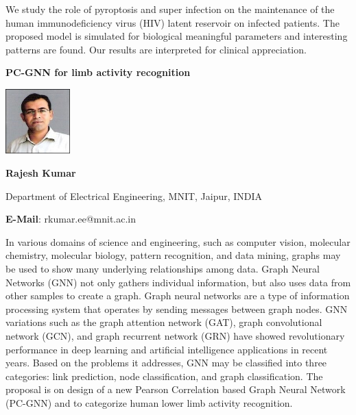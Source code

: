 \documentclass[twoside,11pt]{amsart}
\begin{document}
\vskip 8mm
We study the role of pyroptosis and super infection on the maintenance of the human immunodeficiency virus (HIV) latent reservoir on infected patients. The proposed model is simulated for biological meaningful parameters and interesting patterns are found. Our results are interpreted for clinical appreciation.
\vskip 5mm
\newpage
\vskip 10mm
\begin{center}\bf\LARGE
PC-GNN for limb activity recognition
\end{center}
\vskip 5mm
\begin{center}
\includegraphics[width=2.5cm, height=2.5cm, keepaspectratio=false]{RK2.jpg}
\end{center}
\vskip 2mm

\centerline{\textbf{  Rajesh Kumar }}
\vskip 2mm
\begin{flushleft}
Department of Electrical Engineering, MNIT, Jaipur, INDIA
\end{flushleft}
\vskip 2mm
\begin{flushleft}
\textbf{E-Mail}: rkumar.ee@mnit.ac.in
\end{flushleft}

\vskip 8mm
In various domains of science and engineering, such as computer vision,
molecular chemistry, molecular biology, pattern recognition, and data mining, graphs
may be used to show many underlying relationships among data. Graph Neural
Networks (GNN) not only gathers individual information, but also uses data from other
samples to create a graph. Graph neural networks are a type of information processing
system that operates by sending messages between graph nodes. GNN variations such
as the graph attention network (GAT), graph convolutional network (GCN), and graph
recurrent network (GRN) have showed revolutionary performance in deep learning and
artificial intelligence applications in recent years. Based on the problems it addresses,
GNN may be classified into three categories: link prediction, node classification, and
graph classification. The proposal is on design of a new Pearson Correlation based
Graph Neural Network (PC-GNN) and to categorize human lower limb activity
recognition.
\vskip 5mm
\newpage
\end{document}
